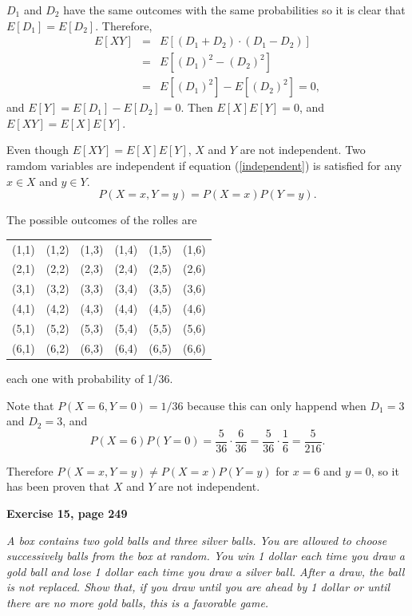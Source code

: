 \documentclass[12pt]{article}
\begin{document}
	$D_1$ and $D_2$ have the same outcomes with the same probabilities so it is clear that $E[D_1] = E[D_2]$. Therefore,
	\begin{eqnarray*}
	E[XY] &=& E[(D_1 + D_2)\cdot(D_1 - D_2)] \\
	&=& E[(D_1)^2 - (D_2)^2] \\
	&=& E[(D_1)^2] - E[(D_2)^2] = 0,
	\end{eqnarray*}
	and $E[Y] = E[D_1] - E[D_2] = 0$. Then $E[X]E[Y] = 0$, and $E[XY] = E[X]E[Y]$.
	 
	Even though $E[XY] = E[X]E[Y]$, $X$ and $Y$ are not independent. Two ramdom variables are independent if equation (\ref{independent}) is satisfied for any $x \in X$ and $y \in Y$.
	\begin{equation}
	P(X = x, Y = y) = P(X=x) P(Y=y).
	\label{independent}
	\end{equation}
	
	The possible outcomes of the rolles are
	\begin{center}
		\begin{tabular}{cccccc}
		(1,1) & (1,2) & (1,3) & (1,4) & (1,5) & (1,6) \\
		(2,1) & (2,2) & (2,3) & (2,4) & (2,5) & (2,6) \\
		(3,1) & (3,2) & (3,3) & (3,4) & (3,5) & (3,6) \\
		(4,1) & (4,2) & (4,3) & (4,4) & (4,5) & (4,6) \\
		(5,1) & (5,2) & (5,3) & (5,4) & (5,5) & (5,6) \\
		(6,1) & (6,2) & (6,3) & (6,4) & (6,5) & (6,6) \\	
		\end{tabular}
	\end{center}
	each one with probability of 1/36. 
	
	Note that $P(X=6, Y=0) = 1/36$ because this can only happend when $D_1 = 3$ and $D_2 = 3$, and  
	\begin{equation*}
	P(X=6)P(Y=0) = \frac{5}{36} \cdot \frac{6}{36} = \frac{5}{36} \cdot \frac{1}{6} = \frac{5}{216}.
	\end{equation*}
	
	Therefore $P(X = x, Y = y) \neq P(X=x) P(Y=y)$ for $x=6$ and $y= 0$, so it has been proven that $X$ and $Y$ are not independent.
	
	{\bf Exercise 15, page 249}
	
	{\em A box contains two gold balls and three silver balls. You are allowed to choose successively balls from the box at random. You win 1 dollar each time you draw a gold ball and lose 1 dollar each time you draw a silver ball. After a draw, the ball is not replaced. Show that, if you draw until you are ahead by 1 dollar or until there are no more gold balls, this is a favorable game.}
	
\end{document}
